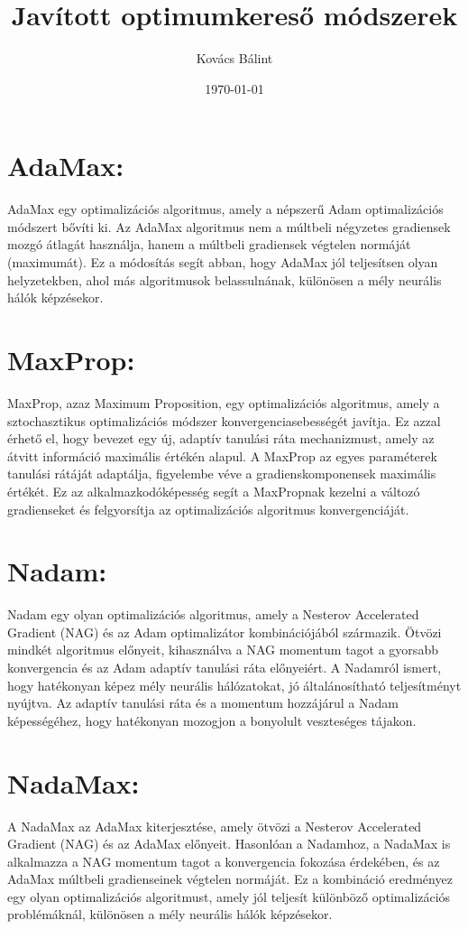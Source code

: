 \documentclass{article}
\begin{document}
\title{Javított optimumkereső módszerek}
\author{Kovács Bálint}
\date{\today}

\maketitle

\section*{AdaMax:}
AdaMax egy optimalizációs algoritmus, amely a népszerű Adam optimalizációs módszert bővíti ki. Az AdaMax algoritmus nem a múltbeli négyzetes gradiensek mozgó átlagát használja, hanem a múltbeli gradiensek végtelen normáját (maximumát). Ez a módosítás segít abban, hogy AdaMax jól teljesítsen olyan helyzetekben, ahol más algoritmusok belassulnának, különösen a mély neurális hálók képzésekor.

\section*{MaxProp:}
MaxProp, azaz Maximum Proposition, egy optimalizációs algoritmus, amely a sztochasztikus optimalizációs módszer konvergenciasebességét javítja. Ez azzal érhető el, hogy bevezet egy új, adaptív tanulási ráta mechanizmust, amely az átvitt információ maximális értékén alapul. A MaxProp az egyes paraméterek tanulási rátáját adaptálja, figyelembe véve a gradienskomponensek maximális értékét. Ez az alkalmazkodóképesség segít a MaxPropnak kezelni a változó gradienseket és felgyorsítja az optimalizációs algoritmus konvergenciáját.

\section*{Nadam:}
Nadam egy olyan optimalizációs algoritmus, amely a Nesterov Accelerated Gradient (NAG) és az Adam optimalizátor kombinációjából származik. Ötvözi mindkét algoritmus előnyeit, kihasználva a NAG momentum tagot a gyorsabb konvergencia és az Adam adaptív tanulási ráta előnyeiért. A Nadamról ismert, hogy hatékonyan képez mély neurális hálózatokat, jó általánosítható teljesítményt nyújtva. Az adaptív tanulási ráta és a momentum hozzájárul a Nadam képességéhez, hogy hatékonyan mozogjon a bonyolult veszteséges tájakon.

\section*{NadaMax:}
A NadaMax az AdaMax kiterjesztése, amely ötvözi a Nesterov Accelerated Gradient (NAG) és az AdaMax előnyeit. Hasonlóan a Nadamhoz, a NadaMax is alkalmazza a NAG momentum tagot a konvergencia fokozása érdekében, és az AdaMax múltbeli gradienseinek végtelen normáját. Ez a kombináció eredményez egy olyan optimalizációs algoritmust, amely jól teljesít különböző optimalizációs problémáknál, különösen a mély neurális hálók képzésekor.
\end{document}
